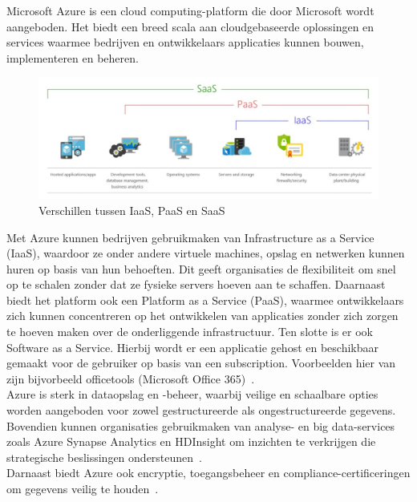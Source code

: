 Microsoft Azure is een cloud computing-platform die door Microsoft wordt aangeboden. Het biedt een breed scala aan cloudgebaseerde oplossingen en services waarmee bedrijven en ontwikkelaars applicaties kunnen bouwen, implementeren en beheren. \\

\begin{figure}[H]
    \centering
    \includegraphics[width=1\textwidth]{./graphics/standvanzaken/verschillen.jpg}
    \caption{Verschillen tussen IaaS, PaaS en SaaS~\autocite{Stoenescu2021}}
\end{figure}

Met Azure kunnen bedrijven gebruikmaken van Infrastructure as a Service (IaaS), waardoor ze onder andere virtuele machines, opslag en netwerken kunnen huren op basis van hun behoeften. Dit geeft organisaties de flexibiliteit om snel op te schalen zonder dat ze fysieke servers hoeven aan te schaffen. Daarnaast biedt het platform ook een Platform as a Service (PaaS), waarmee ontwikkelaars zich kunnen concentreren op het ontwikkelen van applicaties zonder zich zorgen te hoeven maken over de onderliggende infrastructuur. Ten slotte is er ook Software as a Service. Hierbij wordt er een applicatie gehost en beschikbaar gemaakt voor de gebruiker op basis van een subscription. Voorbeelden hier van zijn bijvorbeeld officetools (Microsoft Office 365)~\autocite{Suneetha2024}. \\

Azure is sterk in dataopslag en -beheer, waarbij veilige en schaalbare opties worden aangeboden voor zowel gestructureerde als ongestructureerde gegevens. Bovendien kunnen organisaties gebruikmaken van analyse- en big data-services zoals Azure Synapse Analytics en HDInsight om inzichten te verkrijgen die strategische beslissingen ondersteunen~\autocite{Awati2023}. \\

Darnaast biedt Azure ook encryptie, toegangsbeheer en compliance-certificeringen om gegevens veilig te houden~\autocite{Siddiqui2023}.

